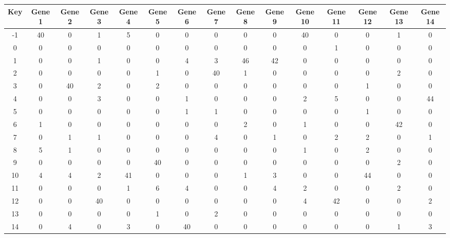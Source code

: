 \begin{tabular}{|c|c|c|c|c|c|c|c|c|c|c|c|c|c|c|}
\hline
Key & Gene 1 & Gene 2 & Gene 3 & Gene 4 & Gene 5 & Gene 6 & Gene 7 & Gene 8 & Gene 9 & Gene 10 & Gene 11 & Gene 12 & Gene 13 & Gene 14 \\
\hline
-1 & 40 & 0 & 1 & 5 & 0 & 0 & 0 & 0 & 0 & 40 & 0 & 0 & 1 & 0 \\
0 & 0 & 0 & 0 & 0 & 0 & 0 & 0 & 0 & 0 & 0 & 1 & 0 & 0 & 0 \\
1 & 0 & 0 & 1 & 0 & 0 & 4 & 3 & 46 & 42 & 0 & 0 & 0 & 0 & 0 \\
2 & 0 & 0 & 0 & 0 & 1 & 0 & 40 & 1 & 0 & 0 & 0 & 0 & 2 & 0 \\
3 & 0 & 40 & 2 & 0 & 2 & 0 & 0 & 0 & 0 & 0 & 0 & 1 & 0 & 0 \\
4 & 0 & 0 & 3 & 0 & 0 & 1 & 0 & 0 & 0 & 2 & 5 & 0 & 0 & 44 \\
5 & 0 & 0 & 0 & 0 & 0 & 1 & 1 & 0 & 0 & 0 & 0 & 1 & 0 & 0 \\
6 & 1 & 0 & 0 & 0 & 0 & 0 & 0 & 2 & 0 & 1 & 0 & 0 & 42 & 0 \\
7 & 0 & 1 & 1 & 0 & 0 & 0 & 4 & 0 & 1 & 0 & 2 & 2 & 0 & 1 \\
8 & 5 & 1 & 0 & 0 & 0 & 0 & 0 & 0 & 0 & 1 & 0 & 2 & 0 & 0 \\
9 & 0 & 0 & 0 & 0 & 40 & 0 & 0 & 0 & 0 & 0 & 0 & 0 & 2 & 0 \\
10 & 4 & 4 & 2 & 41 & 0 & 0 & 0 & 1 & 3 & 0 & 0 & 44 & 0 & 0 \\
11 & 0 & 0 & 0 & 1 & 6 & 4 & 0 & 0 & 4 & 2 & 0 & 0 & 2 & 0 \\
12 & 0 & 0 & 40 & 0 & 0 & 0 & 0 & 0 & 0 & 4 & 42 & 0 & 0 & 2 \\
13 & 0 & 0 & 0 & 0 & 1 & 0 & 2 & 0 & 0 & 0 & 0 & 0 & 0 & 0 \\
14 & 0 & 4 & 0 & 3 & 0 & 40 & 0 & 0 & 0 & 0 & 0 & 0 & 1 & 3 \\
\hline
\end{tabular}